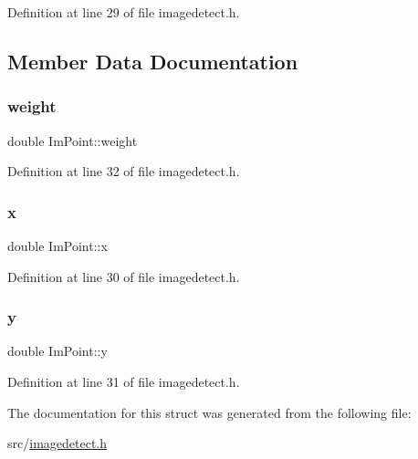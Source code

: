 Definition at line 29 of file imagedetect.\+h.



\subsection{Member Data Documentation}
\mbox{\label{struct_im_point_a590eeac31f26968234c482e700525c7c}} 
\subsubsection{\texorpdfstring{weight}{weight}}
{\footnotesize\ttfamily double Im\+Point\+::weight}



Definition at line 32 of file imagedetect.\+h.

\mbox{\label{struct_im_point_a956198a1aef95b9f295c6f3c5fde5543}} 
\subsubsection{\texorpdfstring{x}{x}}
{\footnotesize\ttfamily double Im\+Point\+::x}



Definition at line 30 of file imagedetect.\+h.

\mbox{\label{struct_im_point_a506d4a0b1b738354e602ce385b8e5f28}} 
\subsubsection{\texorpdfstring{y}{y}}
{\footnotesize\ttfamily double Im\+Point\+::y}



Definition at line 31 of file imagedetect.\+h.



The documentation for this struct was generated from the following file\+:\begin{DoxyCompactItemize}
\item 
src/\mbox{\hyperlink{imagedetect_8h}{imagedetect.\+h}}\end{DoxyCompactItemize}
